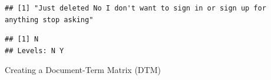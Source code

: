 \documentclass[]{book}
\newenvironment{Shaded}{\begin{snugshade}}{\end{snugshade}}
\newcommand{\DecValTok}[1]{\textcolor[rgb]{0.00,0.00,0.81}{{#1}}}
\newcommand{\CommentTok}[1]{\textcolor[rgb]{0.56,0.35,0.01}{\textit{{#1}}}}
\newcommand{\NormalTok}[1]{{#1}}
\begin{document}
\begin{Shaded}
\end{Shaded}

\begin{verbatim}
## [1] "Just deleted No I don't want to sign in or sign up for anything stop asking"
\end{verbatim}

\begin{Shaded}
\end{Shaded}

\begin{verbatim}
## [1] N
## Levels: N Y
\end{verbatim}

Creating a Document-Term Matrix (DTM)
\end{document}
